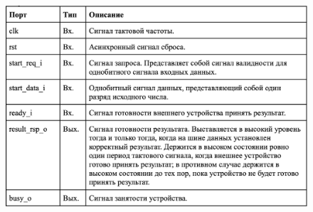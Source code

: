 \documentclass[12pt,onecolumn]{article}
\begin{document}
\begin{figure}[H]
\includegraphics[width=\textwidth]{image/task-count-free.png}
\end{figure}
\end{document}
